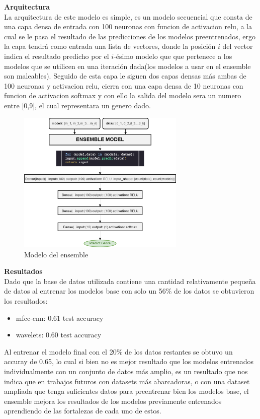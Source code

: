 \documentclass[colorinlistoftodos,twoside,twocolumn,10pt]{article} %
\begin{document}
\textbf{\large Arquitectura}\\
La arquitectura de este modelo es simple, es un modelo secuencial que consta de una capa densa de entrada con 100 neuronas con funcion de activacion relu, a la cual se le pasa el resultado de las predicciones de los modelos preentrenados, ergo la capa tendr\'a como entrada una lista de vectores, donde la posici\'on $i$ del vector indica el resultado predicho por el $i$-\'esimo modelo que que pertenece a los modelos que se utilicen en una iteraci\'on dada(los modelos a usar en el ensemble son maleables).
Seguido de esta capa le siguen dos capas densas m\'as ambas de 100 neuronas y activacion relu, cierra con una capa densa de 10 neuronas con funcion de activacion softmax y con ello la salida del modelo sera un numero entre [0,9], el cual representara un genero dado.

\begin{figure}[h!] %
	\centering
	\includegraphics[width=8cm]{ensemble.png}
	\caption{Modelo del ensemble}
\end{figure}
\textbf{\large Resultados}\\
Dado que la base de datos utilizada contiene una cantidad relativamente peque\~na de datos al entrenar los modelos base con solo un 56\% de los datos se obtuvieron los resultados: 

\begin{itemize}
\item mfcc-cnn: 0.61 test accuracy
\item wavelets: 0.60 test accuracy 
\end{itemize}

Al entrenar el modelo final con el 20\% de los datos restantes se obtuvo un accuray de 0.65, lo cual si bien no es mejor resultado que los modelos entrenados individualmente con un conjunto de datos m\'as amplio, es un resultado que nos indica que en trabajos futuros con datasets m\'as abarcadoras, o con una dataset ampliada que tenga suficientes datos para preentrenar bien los modelos base, el ensemble mejora los resultados de los modelos previamente entrenados aprendiendo de las fortalezas de cada uno de estos.
\end{document}
